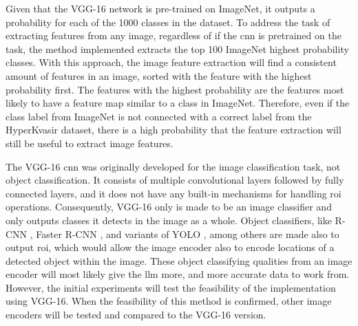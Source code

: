         Given that the VGG-16 network is pre-trained on ImageNet, it outputs a probability for each of the 1000 classes in the dataset. To address the task of extracting features from any image, regardless of if the \gls{cnn} is pretrained on the task, the method implemented extracts the top 100 ImageNet highest probability classes. With this approach, the image feature extraction will find a consistent amount of features in an image, sorted with the feature with the highest probability first. The features with the highest probability are the features most likely to have a feature map similar to a class in ImageNet. Therefore, even if the class label from ImageNet is not connected with a correct label from the HyperKvasir dataset, there is a high probability that the feature extraction will still be useful to extract image features. 

        The VGG-16 \gls{cnn} was originally developed for the image classification task, not object classification. It consists of multiple convolutional layers followed by fully connected layers, and it does not have any built-in mechanisms for handling \gls{roi} operations. Consequently, VGG-16 only is made to be an image classifier and only outputs classes it detects in the image as a whole. Object classifiers, like R-CNN \cite{girshickRichFeatureHierarchies2014}, Faster R-CNN \cite{renFasterRCNNRealTime2015}, and variants of YOLO \cite{redmonYouOnlyLook2016, redmonYOLO9000BetterFaster2016, redmonYOLOv3IncrementalImprovement2018, bochkovskiyYOLOv4OptimalSpeed2020, jocherYolov5, liYOLOv6SingleStageObject2022, wangYOLOv7TrainableBagoffreebies2022, jocherYOLOUltralytics2023}, among others are made also to output \gls{roi}, which would allow the image encoder also to encode locations of a detected object within the image. These object classifying qualities from an image encoder will most likely give the \gls{llm} more, and more accurate data to work from. However, the initial experiments will test the feasibility of the implementation using VGG-16. When the feasibility of this method is confirmed, other image encoders will be tested and compared to the VGG-16 version.



